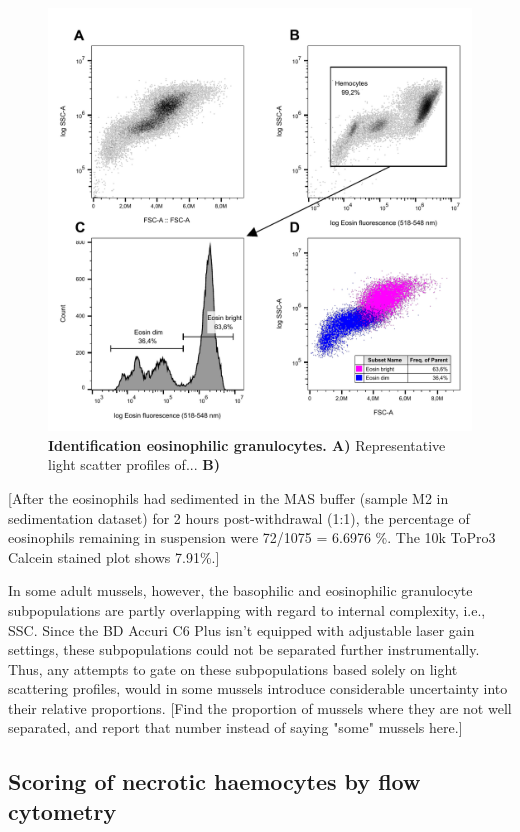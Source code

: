 \begin{figure}[!ht]
    \centering
    \includegraphics[width=.73\textwidth]{figures/Method development/Eosin exp figure for LaTeX.pdf}
    \caption{\textbf{Identification eosinophilic granulocytes. A)} Representative light scatter profiles of... \textbf{B)} }
    \label{fig:eosin_exp2}
\end{figure}

[After the eosinophils had sedimented in the MAS buffer (sample M2 in sedimentation dataset) for 2 hours post-withdrawal (1:1), the percentage of eosinophils remaining in suspension were 72/1075 = 6.6976 \%. The 10k ToPro3 Calcein stained plot shows 7.91\%.]
\newpage

In some adult mussels, however, the basophilic and eosinophilic granulocyte subpopulations are partly overlapping with regard to internal complexity, i.e., SSC. Since the BD Accuri C6 Plus isn't equipped with adjustable laser gain settings, these subpopulations could not be separated further instrumentally. Thus, any attempts to gate on these subpopulations based solely on light scattering profiles, would in some mussels introduce considerable uncertainty into their relative proportions. [Find the proportion of mussels where they are not well separated, and report that number instead of saying "some" mussels here.]



\subsection{Scoring of necrotic haemocytes by flow cytometry}
